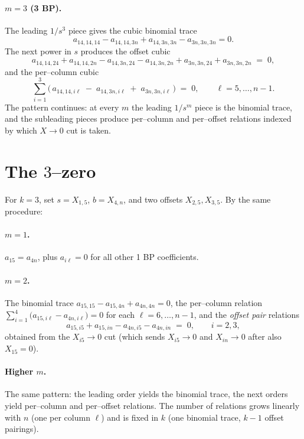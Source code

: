 \documentclass[11pt]{article}
\theoremstyle{definition}
\newcommand{\X}[1]{X_{#1}}
\begin{document}
\paragraph{$m=3$ (3 BP).}
The leading $1/s^{3}$ piece gives the cubic binomial trace
\begin{equation}\label{eq:2zerocubic}
  a_{14,14,14}-a_{14,14,3n}+a_{14,3n,3n}-a_{3n,3n,3n}=0.
\end{equation}
The next power in $s$ produces the offset cubic
\begin{equation}\label{eq:2zerooffsetcubic}
  a_{14,14,24}+a_{14,14,2n}-a_{14,3n,24}-a_{14,3n,2n}+a_{3n,3n,24}+a_{3n,3n,2n}\;=\;0,
\end{equation}
and the per--column cubic
\begin{equation}\label{eq:2zerocolcubic}
  \sum_{i=1}^{3}\big(\,a_{14,14,i\ell}\;-\;a_{14,3n,i\ell}\;+\;a_{3n,3n,i\ell}\,\big)\;=\;0,
  \qquad \ell=5,\dots,n-1.
\end{equation}
The pattern continues: at every $m$ the leading $1/s^m$ piece is the binomial trace, and the
subleading pieces produce per--column and per--offset relations indexed by which $X\!\to\!0$ cut is
taken.

\section{The $3$--zero}
For $k=3$, set $s=\X{1,5}$, $b=\X{4,n}$, and two offsets $\X{2,5}, \X{3,5}$. By the same procedure:
\paragraph{$m=1$.} $a_{15}=a_{4n}$, plus $a_{i\ell}=0$ for all other 1 BP coefficients.
\paragraph{$m=2$.} The binomial trace $a_{15,15}-a_{15,4n}+a_{4n,4n}=0$, the per--column relation
$\sum_{i=1}^{4}\big(a_{15,i\ell}-a_{4n,i\ell}\big)=0$ for each $\ell=6,\dots,n-1$, and the
\emph{offset pair} relations
\begin{equation}\label{eq:3zerooffset}
  a_{15,i5}+a_{15,in}-a_{4n,i5}-a_{4n,in}\;=\;0,\qquad i=2,3,
\end{equation}
obtained from the $\X{i5}\to0$ cut (which sends $\X{i5}\!\to\!0$ and $\X{in}\!\to\!0$ after also
$\X{15}\!=\!0$).
\paragraph{Higher $m$.} The same pattern: the leading order yields the binomial trace, the next
orders yield per--column and per--offset relations. The number of relations grows linearly with $n$
(one per column $\ell$) and is fixed in $k$ (one binomial trace, $k-1$ offset pairings).
\end{document}

